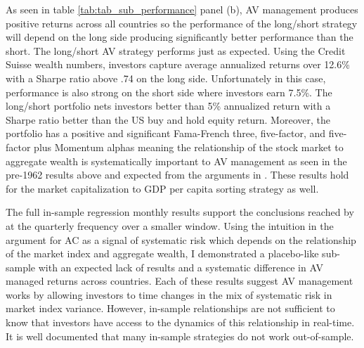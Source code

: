 As seen in table \ref{tab:tab_sub_performance} panel (b), AV management produces positive returns across all countries so the performance of the long/short strategy will depend on the long side producing significantly better performance than the short. The long/short AV strategy performs just as expected. Using the Credit Suisse wealth numbers, investors capture average annualized returns over 12.6\% with a Sharpe ratio above .74 on the long side. Unfortunately in this case, performance is also strong on the short side where investors earn 7.5\%. The long/short portfolio nets investors better than 5\% annualized return with a Sharpe ratio better than the US buy and hold equity return. Moreover, the portfolio has a positive and significant Fama-French three, five-factor, and five-factor plus Momentum
alphas meaning the relationship of the stock market to aggregate wealth is systematically important
 to AV management as seen in the pre-1962 results above and expected from the arguments in \citet{pollet_average_2010}. These results hold for the market capitalization to GDP per capita sorting strategy as well.

The full in-sample regression monthly results support the conclusions reached by \citet{pollet_average_2010} at the quarterly frequency over a smaller window. Using the intuition in the argument for AC as a signal of systematic risk which depends on the relationship of the market index and aggregate wealth, I demonstrated a placebo-like sub-sample with an expected lack of results and a systematic difference in AV managed returns across countries. Each of these results suggest AV management works by allowing investors to time changes in the mix of systematic risk in market index variance. However, in-sample relationships are not sufficient to know that investors have access to the dynamics of this relationship in real-time. It is well documented that many in-sample strategies do not work out-of-sample.